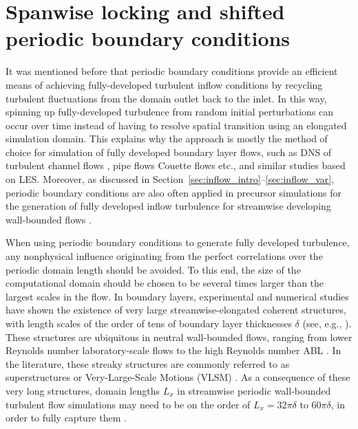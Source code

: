 \section{Spanwise locking and shifted periodic boundary conditions}\label{sec:inflow_shifted}
It was mentioned before that periodic boundary conditions provide an efficient means of achieving fully-developed turbulent inflow conditions by recycling turbulent fluctuations from the domain outlet back to the inlet. In this way, spinning up fully-developed turbulence from random initial perturbations can occur over time instead of having to resolve spatial transition using an elongated simulation domain. This explains why the approach is mostly the method of choice for simulation of fully developed boundary layer flows, such as DNS of turbulent channel flows \citep{kim1987turbulence}, pipe flows \citep{monty2007large,wu2008direct} Couette flows \citep{takahiro2006dns} etc., and similar studies based on LES. Moreover, as discussed in Section~\ref{sec:inflow_intro}--\ref{sec:inflow_var}, periodic boundary conditions are also often applied in precursor simulations for the generation of fully developed inflow turbulence for streamwise developing wall-bounded flows \citep{tabor2010inlet, stevens2014concurrent}.

When using periodic boundary conditions to generate fully developed turbulence, any nonphysical influence originating from the perfect correlations
over the periodic domain length should be avoided. To this end, the size of the computational domain should be chosen to be several times larger than
the largest scales in the flow. In boundary layers, experimental and numerical studies have shown the existence of very large streamwise-elongated
coherent structures, with length scales of the order of tens of boundary layer thicknesses $\delta$ (see, e.g., \citealp{delalamo2003spectra,
tomkins2003spanwise, hutchins2007evidence}). These structures are ubiquitous in neutral wall-bounded flows, ranging from lower Reynolds number
laboratory-scale flows to the high Reynolds number ABL \citep{balakumar2007large,hutchins2012towards}. In the literature, these streaky structures are
commonly referred to as superstructures \citep{hutchins2007evidence} or Very-Large-Scale Motions (VLSM) \citep{kim1999very, fang2015large}. As a
consequence of these very long structures, domain lengths $L_x$ in streamwise periodic wall-bounded turbulent flow simulations may need to be on the
order of $L_x=32\pi\delta$ to  $60\pi\delta$, in order to fully capture them \citep{lozanoduran2014effect,fang2015large}.

